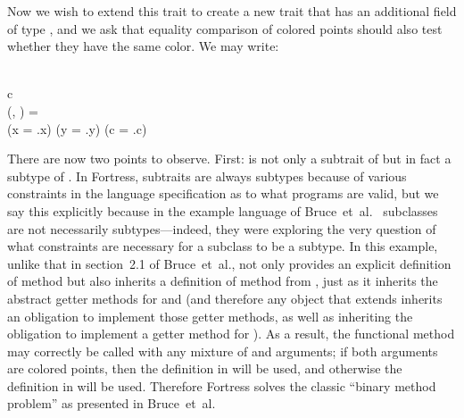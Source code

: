 Now we wish to extend this trait to create a new trait 
that has an additional field  of type , and we ask that equality comparison
of colored points should also test whether they have the same color.
We may write:
\begin{codeexamplesize}
\begin{FortressCode}
    \\
\2\+c\COLON {} \\
  (, \COLON {})\COLON {} = \\
  \2\+(x = .x) \wedge (y = .y) \wedge (c = .c)\-\- \\
\end{FortressCode}
\end{codeexamplesize}
There are now two points to observe.  First:  is not only
a subtrait of  but in fact a subtype of .  In Fortress,
subtraits are always subtypes because of various constraints in the language
specification as to what programs are valid, but we say this explicitly
because in the example language of Bruce~et~al.~\cite{BRUCE-ON-BINARY-METHODS}
subclasses are not necessarily subtypes---indeed, they were exploring the
very question of what constraints are necessary for a subclass to be a subtype.
In this example, unlike that in section~2.1 of Bruce~et~al.,
 not only provides an explicit definition of method 
but also inherits a definition of method  from , just as it inherits
the abstract getter methods for  and  (and therefore any object that
extends  inherits an obligation to implement those getter methods,
as well as inheriting the obligation to implement a getter method for ).
As a result, the functional method  may correctly be called with
any mixture of  and  arguments; if both arguments are
colored points, then the definition in  will be used,
and otherwise the definition in  will be used.
Therefore Fortress solves the classic  ``binary method problem''
as presented in Bruce~et~al.

